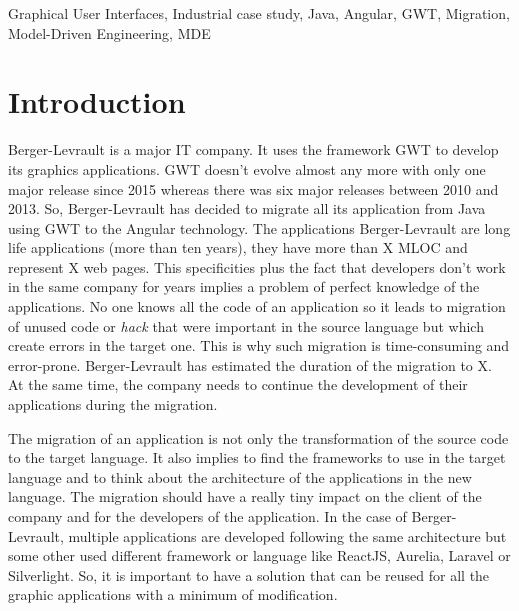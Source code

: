 \documentclass[conference]{IEEEtran}
\begin{document}
    \begin{IEEEkeywords}
        Graphical User Interfaces, Industrial case study, Java, Angular, GWT, 
        Migration, Model-Driven Engineering, MDE
    \end{IEEEkeywords}
    
    
    \section{Introduction}
    \label{sec:intro}
    
    
    Berger-Levrault is a major IT company.
    It uses the framework GWT to develop its graphics applications.
    GWT doesn't evolve almost any more with only one major release since 2015 whereas there was six major releases between 2010 and 2013.
    So, Berger-Levrault has decided to migrate all its application from Java using GWT to the Angular technology.
    The applications Berger-Levrault are long life applications (more than ten years),
        they have more than X MLOC and represent
        X web pages. 
    This specificities plus the fact that developers don't work in the same company for years implies
        a problem of perfect knowledge of the applications.
    No one knows all the code of an application so it leads to migration of unused code or 
        \emph{hack} that were important in the source language but which create errors in the target one.
    This is why such migration is time-consuming and error-prone.
    Berger-Levrault has estimated the duration of the migration to X.
    At the same time, the company needs to continue the development of their applications during the migration.
    
    
    The migration of an application is not only the transformation of the source code to the target language. 
    It also implies to find the frameworks to use in the target language 
        and to think about the architecture of the applications in the new language.
    The migration should have a really tiny impact on the client of the company and for the developers of the application.
    In the case of Berger-Levrault, multiple applications are developed following the same architecture
        but some other used different framework or language like ReactJS, Aurelia, Laravel or Silverlight.
    So, it is important to have a solution that can be reused for all the graphic applications with a minimum of modification.
    
\end{document}
